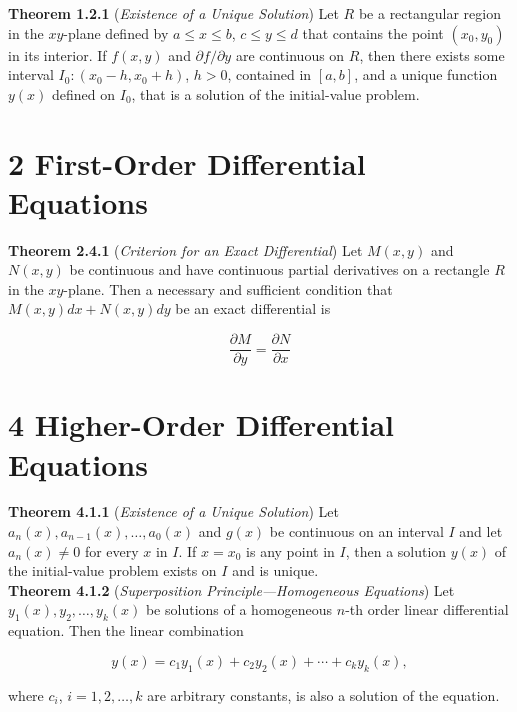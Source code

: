 \documentclass[12pt]{article}
\begin{document}
\noindent\textbf{Theorem 1.2.1} (\emph{Existence of a Unique Solution}) Let \(R\) be a rectangular region in the \(xy\)-plane defined by \(a \leq x \leq b\), \(c \leq y \leq d\) that contains the point \(\left(x_0, y_0\right)\) in its interior. If \(f(x,y)\) and \(\partial{f}/\partial{y}\) are continuous on \(R\), then there exists some interval \(I_0: (x_0 - h, x_0 + h)\), \(h > 0\), contained in \([a, b]\), and a unique function \(y(x)\) defined on \(I_0\), that is a solution of the initial-value problem. 

\section*{2 First-Order Differential Equations}

\noindent\textbf{Theorem 2.4.1} (\emph{Criterion for an Exact Differential}) Let \(M(x,y)\) and \(N(x,y)\) be continuous and have continuous partial derivatives on a rectangle \(R\) in the \(xy\)-plane. Then a necessary and sufficient condition that \(M(x,y)dx + N(x,y)dy\) be an exact differential is

\begin{equation}
    \frac{\partial M}{\partial y} = \frac{\partial N}{\partial x}
\end{equation}

\section*{4 Higher-Order Differential Equations}

\noindent\textbf{Theorem 4.1.1} (\emph{Existence of a Unique Solution}) Let \(a_n(x), a_{n-1}(x), \ldots, a_0(x)\) and \(g(x)\) be continuous on an interval \(I\) and let \(a_n(x)\neq 0\) for every \(x\) in \(I\). If \(x = x_0\) is any point in \(I\), then a solution \(y(x)\) of the initial-value problem exists on \(I\) and is unique.\\

\noindent\textbf{Theorem 4.1.2} (\emph{Superposition Principle—Homogeneous Equations}) Let \(y_1(x), y_2, \ldots, y_k(x)\) be solutions of a homogeneous \(n\)-th order linear differential equation. Then the linear combination

\begin{equation}
    y(x) = c_1y_1(x) + c_2y_2(x) + \cdots + c_ky_k(x),
\end{equation}

\noindent where \(c_i\), \(i = 1, 2, \ldots, k\) are arbitrary constants, is also a solution of the equation.\\
\end{document}
